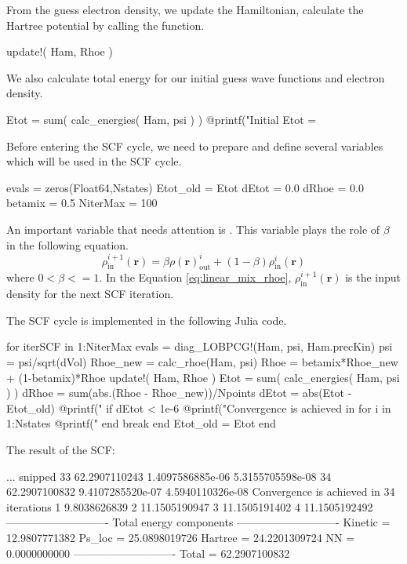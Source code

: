 From the guess electron density, we update the Hamiltonian, calculate the
Hartree potential by calling the  function.
\begin{juliacode}
update!( Ham, Rhoe )
\end{juliacode}

We also calculate total energy for our initial guess wave functions and electron
density.
\begin{juliacode}
Etot = sum( calc_energies( Ham, psi ) )
@printf("Initial Etot = %
\end{juliacode}

Before entering the SCF cycle, we need to prepare and define several variables
which will be used in the SCF cycle.
\begin{juliacode}
evals = zeros(Float64,Nstates)
Etot_old = Etot
dEtot = 0.0
dRhoe = 0.0
betamix = 0.5
NiterMax = 100
\end{juliacode}
An important variable that needs attention is . This variable
plays the role of $\beta$ in the following equation.
\begin{equation}
\rho^{i+1}_{\mathrm{in}}(\mathbf{r}) = \beta\rho(\mathbf{r})^{i}_{\mathrm{out}} +
(1 - \beta)\rho^{i}_{\mathrm{in}}(\mathbf{r})
\label{eq:linear_mix_rhoe}
\end{equation}
where $0 < \beta <= 1$.
In the Equation \eqref{eq:linear_mix_rhoe}, $\rho^{i+1}_{\mathrm{in}}(\mathbf{r})$
is the input density for the next SCF iteration.

The SCF cycle is implemented in the following Julia code.
\begin{juliacode}
for iterSCF in 1:NiterMax
  evals = diag_LOBPCG!(Ham, psi, Ham.precKin)
  psi = psi/sqrt(dVol)
  Rhoe_new = calc_rhoe(Ham, psi)
  Rhoe = betamix*Rhoe_new + (1-betamix)*Rhoe
  update!( Ham, Rhoe )
  Etot = sum( calc_energies( Ham, psi ) )
  dRhoe = sum(abs.(Rhoe - Rhoe_new))/Npoints
  dEtot = abs(Etot - Etot_old)
  @printf("%
  if dEtot < 1e-6
    @printf("Convergence is achieved in %
    for i in 1:Nstates
      @printf("%
    end
    break
  end
  Etot_old = Etot
end
\end{juliacode}

The result of the SCF:
\begin{textcode}
... snipped
  33      62.2907110243   1.4097586885e-06   5.3155705598e-08
  34      62.2907100832   9.4107285520e-07   4.5940110326e-08
Convergence is achieved in 34 iterations
 1       9.8038626839
 2      11.1505190947
 3      11.1505191402
 4      11.1505192492
----------------------------
Total energy components
----------------------------
Kinetic =      12.9807771382
Ps_loc  =      25.0898019726
Hartree =      24.2201309724
NN      =       0.0000000000
----------------------------
Total   =      62.2907100832
\end{textcode}




